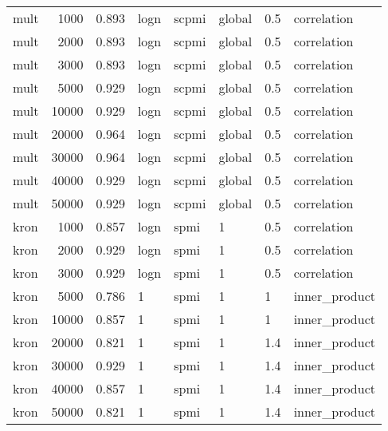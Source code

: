 \begin{tabular}{lrrlllll}
    mult &            1000 &      0.893 &  logn &  scpmi &  global &  0.5 &    correlation \\
    mult &            2000 &      0.893 &  logn &  scpmi &  global &  0.5 &    correlation \\
    mult &            3000 &      0.893 &  logn &  scpmi &  global &  0.5 &    correlation \\
    mult &            5000 &      0.929 &  logn &  scpmi &  global &  0.5 &    correlation \\
    mult &           10000 &      0.929 &  logn &  scpmi &  global &  0.5 &    correlation \\
    mult &           20000 &      0.964 &  logn &  scpmi &  global &  0.5 &    correlation \\
    mult &           30000 &      0.964 &  logn &  scpmi &  global &  0.5 &    correlation \\
    mult &           40000 &      0.929 &  logn &  scpmi &  global &  0.5 &    correlation \\
    mult &           50000 &      0.929 &  logn &  scpmi &  global &  0.5 &    correlation \\
    kron &            1000 &      0.857 &  logn &   spmi &       1 &  0.5 &    correlation \\
    kron &            2000 &      0.929 &  logn &   spmi &       1 &  0.5 &    correlation \\
    kron &            3000 &      0.929 &  logn &   spmi &       1 &  0.5 &    correlation \\
    kron &            5000 &      0.786 &     1 &   spmi &       1 &    1 &  inner\_product \\
    kron &           10000 &      0.857 &     1 &   spmi &       1 &    1 &  inner\_product \\
    kron &           20000 &      0.821 &     1 &   spmi &       1 &  1.4 &  inner\_product \\
    kron &           30000 &      0.929 &     1 &   spmi &       1 &  1.4 &  inner\_product \\
    kron &           40000 &      0.857 &     1 &   spmi &       1 &  1.4 &  inner\_product \\
    kron &           50000 &      0.821 &     1 &   spmi &       1 &  1.4 &  inner\_product \\
\bottomrule
\end{tabular}
